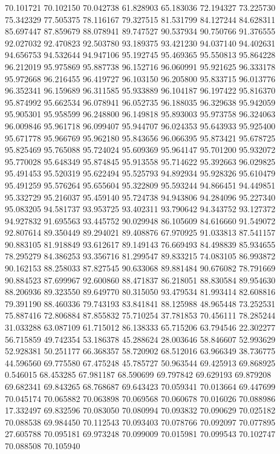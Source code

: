 70.101721
70.102150
70.042738
61.828903
65.183036
72.194327
73.225730
75.342329
77.505375
78.116167
79.327515
81.531799
84.127244
84.628311
85.697447
87.859679
88.078941
89.747527
90.537934
90.750766
91.376555
92.027032
92.470823
92.503780
93.189375
93.421230
94.037140
94.402631
94.656753
94.532644
94.947106
95.192745
95.469365
95.550813
95.864228
96.212019
95.975869
95.887738
96.152716
96.060991
95.921625
96.333178
95.972668
96.216455
96.419727
96.103150
96.205800
95.833715
96.013776
96.352341
96.159689
96.311585
95.933889
96.104187
96.197422
95.816370
95.874992
95.662534
96.078941
96.052735
96.188035
96.329638
95.942059
95.905301
95.958599
96.248800
96.149818
95.893003
95.973758
96.324063
96.009846
95.961718
96.099407
95.944707
96.024353
95.643933
95.925400
95.671778
95.966769
95.962180
95.843656
96.066395
95.873421
95.678725
95.825469
95.765088
95.724024
95.609369
95.964147
95.701200
95.932072
95.770028
95.648349
95.874845
95.913558
95.714622
95.392663
96.029825
95.491453
95.520319
95.622494
95.525793
94.892934
95.928326
95.610479
95.491259
95.576264
95.655604
95.322809
95.593244
94.866451
94.449851
95.332729
95.216037
95.459140
95.724738
94.943806
94.284096
95.227340
95.083205
94.581737
93.953725
93.402311
93.790642
94.343752
93.127372
94.927832
91.695563
93.445752
90.029948
86.105609
84.616660
91.549072
92.807614
89.350449
89.294021
89.408876
67.970925
91.033813
87.541157
90.883105
81.918849
93.612617
89.149143
76.669493
84.498839
85.934655
78.295279
84.386253
93.356716
81.299547
89.833215
74.083105
86.993872
90.162153
88.258033
87.827545
90.633068
89.881484
90.676082
78.791669
90.884523
87.699967
92.600860
88.471837
86.218051
88.830584
89.954630
88.206936
89.323550
89.649770
80.315050
93.479534
81.993414
82.608816
79.391190
88.460336
79.743193
83.841841
88.125988
48.965448
73.252531
75.887416
72.806884
87.855832
75.710254
37.781853
70.456111
78.285244
31.033288
63.087109
61.715012
86.138333
65.715206
63.794546
22.302277
56.715859
49.742354
53.186378
45.288624
28.003646
58.846607
52.993629
52.928381
50.251177
66.368357
58.720902
68.512016
63.966349
38.736775
44.596560
69.775580
67.475248
45.785727
50.963544
69.425913
69.868925
0.546015
68.453285
67.981187
68.590699
69.797842
69.629193
69.879208
69.682341
69.843265
68.768687
69.643423
70.059341
70.013664
69.447699
70.045174
70.065882
70.063898
70.069568
70.060678
70.016026
70.088986
17.332497
69.832596
70.083050
70.080994
70.093832
70.090629
70.025182
70.088538
69.984450
70.112543
70.093403
70.078766
70.092097
70.077895
27.605788
70.095181
69.973248
70.099009
70.015981
70.099543
70.102747
70.088508
70.105940
